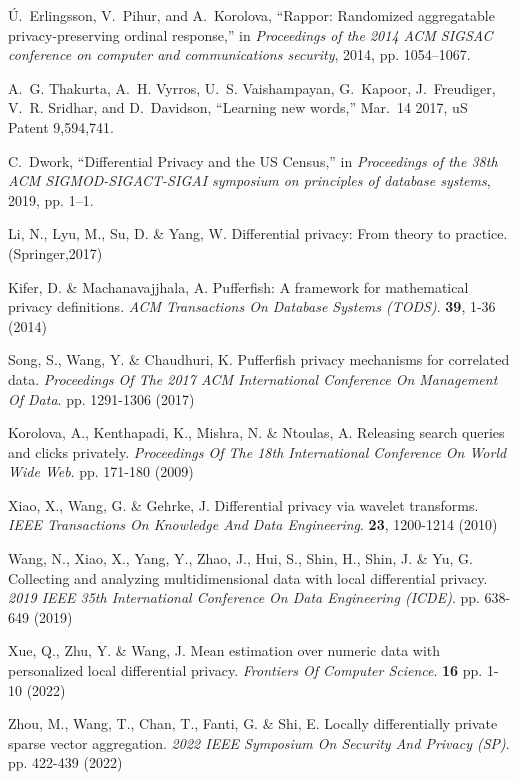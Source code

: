 \begin{thebibliography}{10}
\begin{small}
{\'U}.~Erlingsson, V.~Pihur, and A.~Korolova, ``Rappor: Randomized aggregatable
privacy-preserving ordinal response,'' in \emph{Proceedings of the 2014 ACM
	SIGSAC conference on computer and communications security}, 2014, pp.
1054--1067.

A.~G. Thakurta, A.~H. Vyrros, U.~S. Vaishampayan, G.~Kapoor, J.~Freudiger,
V.~R. Sridhar, and D.~Davidson, ``Learning new words,'' Mar.~14 2017, uS
Patent 9,594,741.


C.~Dwork, ``{Differential Privacy and the US Census},'' in \emph{Proceedings of
	the 38th ACM SIGMOD-SIGACT-SIGAI symposium on principles of database
	systems}, 2019, pp. 1--1.
	
Li, N., Lyu, M., Su, D. \& Yang, W. Differential privacy: From theory to practice. (Springer,2017)

Kifer, D. \& Machanavajjhala, A. Pufferfish: A framework for mathematical privacy definitions. {\em ACM Transactions On Database Systems (TODS)}. \textbf{39}, 1-36 (2014)

	
Song, S., Wang, Y. \& Chaudhuri, K. Pufferfish privacy mechanisms for correlated data. {\em Proceedings Of The 2017 ACM International Conference On Management Of Data}. pp. 1291-1306 (2017)	

Korolova, A., Kenthapadi, K., Mishra, N. \& Ntoulas, A. Releasing search queries and clicks privately. {\em Proceedings Of The 18th International Conference On World Wide Web}. pp. 171-180 (2009)

Xiao, X., Wang, G. \& Gehrke, J. Differential privacy via wavelet transforms. {\em IEEE Transactions On Knowledge And Data Engineering}. \textbf{23}, 1200-1214 (2010)

Wang, N., Xiao, X., Yang, Y., Zhao, J., Hui, S., Shin, H., Shin, J. \& Yu, G. Collecting and analyzing multidimensional data with local differential privacy. {\em 2019 IEEE 35th International Conference On Data Engineering (ICDE)}. pp. 638-649 (2019)

Xue, Q., Zhu, Y. \& Wang, J. Mean estimation over numeric data with personalized local differential privacy. {\em Frontiers Of Computer Science}. \textbf{16} pp. 1-10 (2022)

Zhou, M., Wang, T., Chan, T., Fanti, G. \& Shi, E. Locally differentially private sparse vector aggregation. {\em 2022 IEEE Symposium On Security And Privacy (SP)}. pp. 422-439 (2022)


\end{small}
\end{thebibliography}
